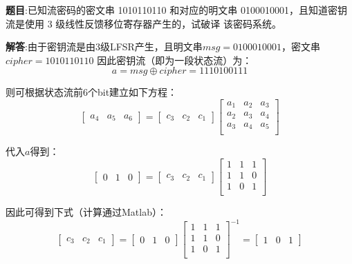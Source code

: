 \textbf{题目}:已知流密码的密文串 1010110110 和对应的明文串
0100010001，且知道密钥流是使用 3 级线性反馈移位寄存器产生的，试破译
该密码系统。

\textbf{解答}:由于密钥流是由3级LFSR产生，且明文串$msg=0100010001$，密文串$cipher=1010110110$
因此密钥流（即为一段状态流）为：
\begin{equation}
    a = msg \oplus cipher = 1110100111
\end{equation}

则可根据状态流前$6$个bit建立如下方程：
\begin{equation}
    \left[
        \begin{matrix}
            a_4&a_5&a_6
        \end{matrix}
    \right]
    =
    \left[
        \begin{matrix}
            c_3&c_2&c_1
        \end{matrix}
    \right]
    \left[
        \begin{matrix}
            a_1 & a_2 & a_3\\
            a_2 & a_3 & a_4\\
            a_3 & a_4 & a_5\\
        \end{matrix}
    \right]
\end{equation}

代入$a$得到：
\begin{equation}
    \left[
        \begin{matrix}
            0&1&0
        \end{matrix}
    \right]
    =
    \left[
        \begin{matrix}
            c_3&c_2&c_1
        \end{matrix}
    \right]
    \left[
        \begin{matrix}
            1 &1 &1\\
            1 &1 &0\\
            1 &0 &1\\
        \end{matrix}
    \right]
\end{equation}

因此可得到下式（计算通过Matlab）：
\begin{equation}
    \left[
        \begin{matrix}
            c_3&c_2&c_1
        \end{matrix}
    \right]
    =
    \left[
        \begin{matrix}
            0&1&0
        \end{matrix}
    \right]
    \left[
        \begin{matrix}
            1 &1 &1\\
            1 &1 &0\\
            1 &0 &1\\
        \end{matrix}
    \right]^{-1}
    =    \left[
        \begin{matrix}
            1&0&1
        \end{matrix}
    \right]
\end{equation}

